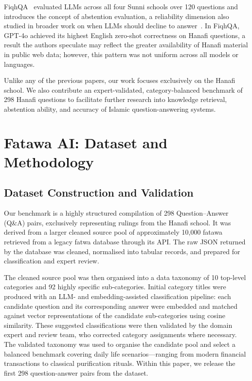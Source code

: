 \documentclass[runningheads]{llncs}
\begin{document}
FiqhQA~\cite{atif2025fiqhqa} evaluated LLMs across all four Sunni schools over 120 questions and introduces the concept of abstention evaluation, a reliability dimension also studied in broader work on when LLMs should decline to answer~\cite{madhusudhan2024llms}. In FiqhQA, GPT-4o achieved its highest English zero-shot correctness on Hanafi questions, a result the authors speculate may reflect the greater availability of Hanafi material in public web data; however, this pattern was not uniform across all models or languages.

Unlike any of the previous papers, our work focuses exclusively on the Hanafi school. We also contribute an expert-validated, category-balanced benchmark of 298 Hanafi questions to facilitate further research into knowledge retrieval, abstention ability, and accuracy of Islamic question-answering systems.

\section{Fatawa AI: Dataset and Methodology}

\subsection{Dataset Construction and Validation}
Our benchmark is a highly structured compilation of 298 Question--Answer (Q\&A) pairs, exclusively representing rulings from the Hanafi school. It was derived from a larger cleaned source pool of approximately 10{,}000 fatawa retrieved from a legacy fatwa database through its API. The raw JSON returned by the database was cleaned, normalised into tabular records, and prepared for classification and expert review.

The cleaned source pool was then organised into a data taxonomy of 10 top-level categories and 92 highly specific sub-categories. Initial category titles were produced with an LLM- and embedding-assisted classification pipeline: each candidate question and its corresponding answer were embedded and matched against vector representations of the candidate sub-categories using cosine similarity. These suggested classifications were then validated by the domain expert and review team, who corrected category assignments where necessary. The validated taxonomy was used to organise the candidate pool and select a balanced benchmark covering daily life scenarios---ranging from modern financial transactions to classical purification rituals. Within this paper, we release the first 298 question-answer pairs from the dataset.
\end{document}
